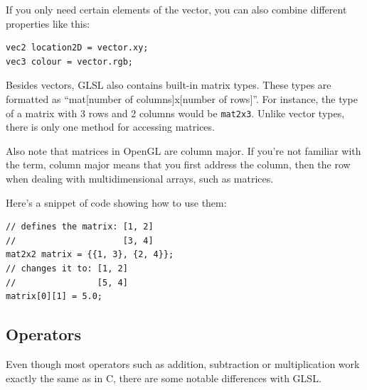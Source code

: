 If you only need certain elements of the vector, you can also combine different properties like this:

\begin{verbatim}
vec2 location2D = vector.xy;
vec3 colour = vector.rgb;
\end{verbatim}

Besides vectors, GLSL also contains built-in matrix types. These types are formatted as ``mat[number of columns]x[number of rows]''. For instance, the type of a matrix with 3 rows and 2 columns would be \texttt{mat2x3}. Unlike vector types, there is only one method for accessing matrices. 

Also note that matrices in OpenGL are column major. If you're not familiar with the term, column major means that you first address the column, then the row when dealing with multidimensional arrays, such as matrices. 

Here's a snippet of code showing how to use them:

\begin{verbatim}
// defines the matrix: [1, 2]
//                     [3, 4]
mat2x2 matrix = {{1, 3}, {2, 4}};
// changes it to: [1, 2]
//                [5, 4]
matrix[0][1] = 5.0;
\end{verbatim}




\subsection{Operators}

Even though most operators such as addition, subtraction or multiplication work exactly the same as in C, there are some notable differences with GLSL.

